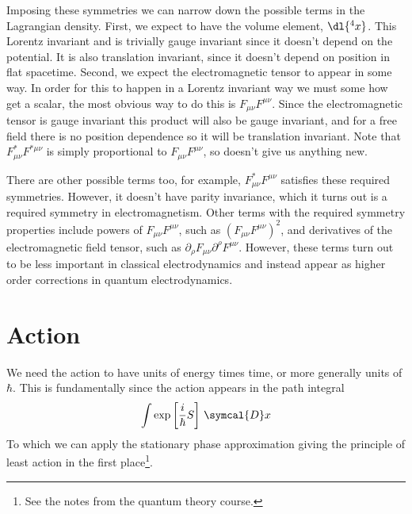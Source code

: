 Imposing these symmetries we can narrow down the possible terms in the Lagrangian density.
First, we expect to have the volume element, \(\dl{^4x}\).
This Lorentz invariant and is trivially gauge invariant since it doesn't depend on the potential.
It is also translation invariant, since it doesn't depend on position in flat spacetime.
Second, we expect the electromagnetic tensor to appear in some way.
In order for this to happen in a Lorentz invariant way we must some how get a scalar, the most obvious way to do this is \(F_{\mu\nu}F^{\mu\nu}\).
Since the electromagnetic tensor is gauge invariant this product will also be gauge invariant, and for a free field there is no position dependence so it will be translation invariant.
Note that \(F^{*}_{\mu\nu}F^{*\mu\nu}\) is simply proportional to \(F_{\mu\nu}F^{\mu\nu}\), so doesn't give us anything new.

There are other possible terms too, for example, \(F^*_{\mu\nu}F^{\mu\nu}\) satisfies these required symmetries.
However, it doesn't have parity invariance, which it turns out is a required symmetry in electromagnetism.
Other terms with the required symmetry properties include powers of \(F_{\mu\nu}F^{\mu\nu}\), such as \((F_{\mu\nu}F^{\mu\nu})^2\), and derivatives of the electromagnetic field tensor, such as \(\partial_\rho F_{\mu\nu} \partial^\rho F^{\mu\nu}\).
However, these terms turn out to be less important in classical electrodynamics and instead appear as higher order corrections in quantum electrodynamics.

\section{Action}
We need the action to have units of energy times time, or more generally units of \(\hbar\).
This is fundamentally since the action appears in the path integral
\begin{equation}
    \int \exp\left[ \frac{i}{\hbar}S \right] \, \symcal{D}x
\end{equation}
To which we can apply the stationary phase approximation giving the principle of least action in the first place\footnote{See the notes from the quantum theory course.}.

